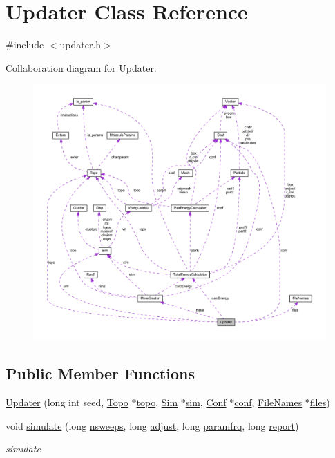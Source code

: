 \hypertarget{class_updater}{\section{Updater Class Reference}
\label{class_updater}
}


{\ttfamily \#include $<$updater.\+h$>$}



Collaboration diagram for Updater\+:\nopagebreak
\begin{figure}[H]
\begin{center}
\leavevmode
\includegraphics[width=350pt]{class_updater__coll__graph}
\end{center}
\end{figure}
\subsection*{Public Member Functions}
\begin{DoxyCompactItemize}
\item 
\hyperlink{class_updater_a53fc3a29ff7b8457744815f77590ba4d}{Updater} (long int seed, \hyperlink{class_topo}{Topo} $\ast$\hyperlink{class_updater_a2ac7e890d9b19cd1c8074ef5e2b8fd14}{topo}, \hyperlink{class_sim}{Sim} $\ast$\hyperlink{class_updater_a0436d5371f3fdc707e323b84ea7356fe}{sim}, \hyperlink{class_conf}{Conf} $\ast$\hyperlink{class_updater_a2f0686ac33efa6f1712431b37d0c1ba1}{conf}, \hyperlink{struct_file_names}{File\+Names} $\ast$\hyperlink{class_updater_ab29cd3f9d7d825aa83cd98aa18b53752}{files})
\item 
void \hyperlink{class_updater_a42cde2ba4af4b35d0265a183a42cea20}{simulate} (long \hyperlink{class_updater_aabcc5bfefc334a9514c481f31bcf9c06}{nsweeps}, long \hyperlink{class_updater_af7b8b8f187a21d9683cd4fea2dd5fbd7}{adjust}, long \hyperlink{class_updater_ab992a0a03d5ff6a550596d457e3df5b8}{paramfrq}, long \hyperlink{class_updater_a3dc9b09abafeebacf23cd7c7d17f5655}{report})
\begin{DoxyCompactList}\small\item\em simulate \end{DoxyCompactList}\end{DoxyCompactItemize}
